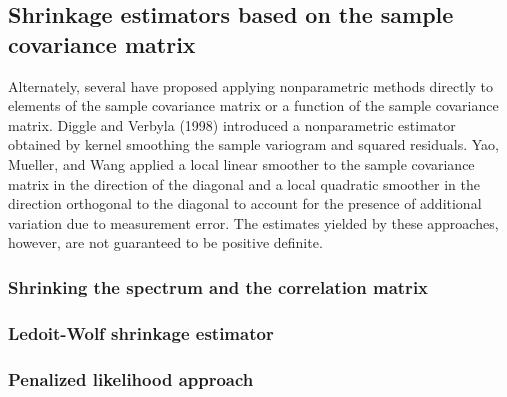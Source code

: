 \documentclass[12pt]{article}
\newcommand*\needsparaphrased{\color{red}}
\theoremstyle{definition}
\begin{document}
\subsection{Shrinkage estimators based on the sample covariance matrix}


Alternately, several have proposed applying nonparametric methods directly to elements of the sample covariance matrix or a function of the sample covariance matrix. Diggle and Verbyla (1998) introduced a nonparametric estimator obtained by kernel smoothing the sample variogram and squared residuals.  Yao, Mueller, and Wang applied a local linear smoother to the sample covariance matrix in the direction of the diagonal and a local quadratic smoother in the direction orthogonal to the diagonal to account for the presence of additional variation due to measurement error.  {\needsparaphrased{[REVIEW 2009 WU AND POURAHMADI METHOD: banding the sample covariance matrix. Under the assumption of short range dependency, they show that their estimator converges to the true covariance matrix for a broad class of nonlinear processes.]} }The estimates yielded by these approaches, however, are not guaranteed to be positive definite. 


\subsubsection{Shrinking the spectrum and the correlation matrix}
\subsubsection{Ledoit-Wolf shrinkage estimator}
\subsubsection{Penalized likelihood approach}
\end{document}
